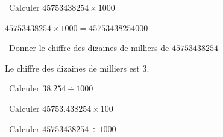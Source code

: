 \begin{questions}
	
	\newpage
	
	\question[1]  Calculer $\num{45753438254} \times 1000$
	
	\begin{solution}
		$\num{45753438254} \times 1000 = \num{45753438254000}$
	\end{solution}
	
	\question[1]  Donner le chiffre des dizaines de milliers de $\num{45753438254}$
	
	\begin{solution}
		Le chiffre des dizaines de milliers est 3.
	\end{solution}
	
	
	
	
	
	\question[1]  Calculer $\num{38.254} \div 1000$
	
	\fillwithdottedlines{2cm}
	
	
	\question[1]  Calculer $\num{45753.438254} \times 100$
	
	\fillwithdottedlines{2cm}
	
	\question[1]  Calculer $\num{45753438254} \div 1000$
	
	\fillwithdottedlines{2cm}
\end{questions}


